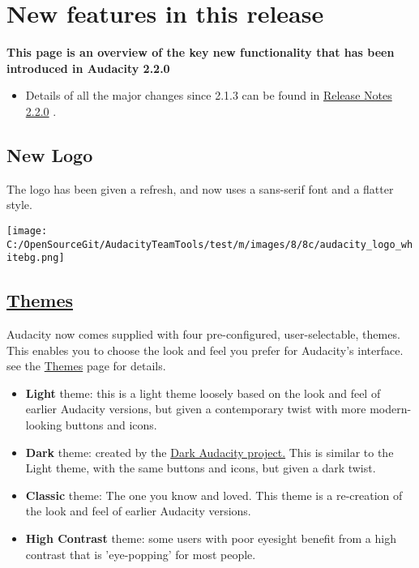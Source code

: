 
\chapter{New features in this release}

\label{XXX}

\begin{multicols}{2}

\textbf{This page is an overview of the key new functionality that has been introduced in Audacity 2.2.0}
\begin{itemize}
\item Details of all the major changes since 2.1.3 can be found in 
\hyperref[XXX\foo{https:__wiki.audacityteam.org_wiki_Release_Notes_2.2.0}]{Release Notes 2.2.0}
.
\end{itemize}

\section{New Logo}The logo has been given a refresh, and now uses a sans-serif font and a flatter style.
\par \texttt{[image: C:/OpenSourceGit/AudacityTeamTools/test/m/images/8/8c/audacity\_logo\_whitebg.png]}\par 
\section{
\hyperref[XXX\foo{themes_}]{Themes}
}Audacity now comes supplied with four pre-configured, user-selectable, themes.  This enables you to choose the look and feel you prefer for Audacity's interface. see the 
\hyperref[XXX\foo{themes_}]{Themes}
 page for details.

\begin{itemize}
\item \textbf{Light} theme: this is a light theme loosely based on the look and feel of earlier Audacity versions, but given a contemporary twist with more modern-looking buttons and icons. 
\item \textbf{Dark} theme: created by the 
\hyperref[XXX\foo{http:__www.darkaudacity.com_}]{Dark Audacity project.}
 This is similar to the Light theme, with the same buttons and icons, but given a dark twist.
\item \textbf{Classic} theme: The one you know and loved. This theme is a re-creation of the look and feel of earlier Audacity versions. 
\item \textbf{High Contrast} theme: some users with poor eyesight benefit from a high contrast that is 'eye-popping' for most people.
\end{itemize}


\end{multicols}
